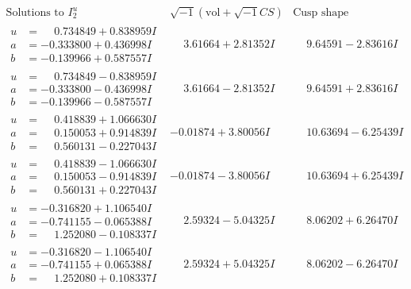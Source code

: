 \documentclass[1p]{elsarticle_modified}
\theoremstyle{definition}
\newcommand{\I}{\sqrt{-1}}
\begin{document}
$$\begin{array}{c|c|c}  
\text{Solutions to }I^u_{2}& \I (\text{vol} + \sqrt{-1}CS) & \text{Cusp shape}\\
 \hline 
\begin{aligned}
u &= \phantom{-}0.734849 + 0.838959 I \\
a &= -0.333800 + 0.436998 I \\
b &= -0.139966 + 0.587557 I\end{aligned}
 & \phantom{-}3.61664 + 2.81352 I & \phantom{-}9.64591 - 2.83616 I \\ \hline\begin{aligned}
u &= \phantom{-}0.734849 - 0.838959 I \\
a &= -0.333800 - 0.436998 I \\
b &= -0.139966 - 0.587557 I\end{aligned}
 & \phantom{-}3.61664 - 2.81352 I & \phantom{-}9.64591 + 2.83616 I \\ \hline\begin{aligned}
u &= \phantom{-}0.418839 + 1.066630 I \\
a &= \phantom{-}0.150053 + 0.914839 I \\
b &= \phantom{-}0.560131 - 0.227043 I\end{aligned}
 & -0.01874 + 3.80056 I & \phantom{-}10.63694 - 6.25439 I \\ \hline\begin{aligned}
u &= \phantom{-}0.418839 - 1.066630 I \\
a &= \phantom{-}0.150053 - 0.914839 I \\
b &= \phantom{-}0.560131 + 0.227043 I\end{aligned}
 & -0.01874 - 3.80056 I & \phantom{-}10.63694 + 6.25439 I \\ \hline\begin{aligned}
u &= -0.316820 + 1.106540 I \\
a &= -0.741155 - 0.065388 I \\
b &= \phantom{-}1.252080 - 0.108337 I\end{aligned}
 & \phantom{-}2.59324 - 5.04325 I & \phantom{-}8.06202 + 6.26470 I \\ \hline\begin{aligned}
u &= -0.316820 - 1.106540 I \\
a &= -0.741155 + 0.065388 I \\
b &= \phantom{-}1.252080 + 0.108337 I\end{aligned}
 & \phantom{-}2.59324 + 5.04325 I & \phantom{-}8.06202 - 6.26470 I \\ \hline\begin{aligned}

\end{aligned}
\end{array}$$
\end{document}

